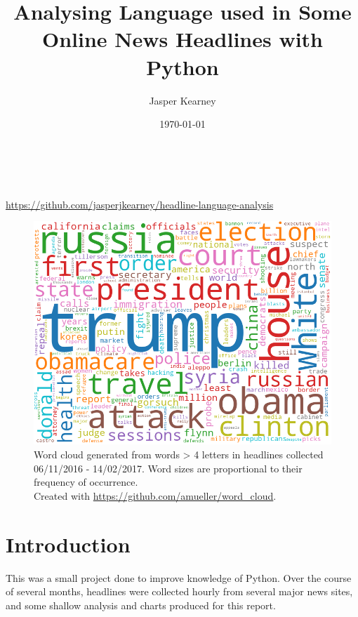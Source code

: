 \documentclass[a4paper,12pt]{article}
\title{Analysing Language used in Some Online News Headlines with Python}
\author{Jasper Kearney}
\date{\today}
\begin{document}
\makeatletter
\begin{titlepage}
    \begin{center}
        \vfill
        \huge \textbf{\@title} \\
        \vspace{1cm}
        \large \@author \\
        \vspace{1cm}
        \small \url{https://github.com/jasperjkearney/headline-language-analysis} \\
        
        \begin{figure}[h]
            \centering
            \includegraphics[width=\linewidth]{word_cloud.png}
            \caption{Word cloud generated from words > 4 letters in headlines collected 06/11/2016 - 14/02/2017. Word sizes are proportional to their frequency of occurrence.\\ Created with \url{https://github.com/amueller/word_cloud}.}
        \end{figure}
    \end{center}
\end{titlepage}
\makeatother

\section{Introduction}
This was a small project done to improve knowledge of Python. Over the course of several months, headlines were collected hourly from several major news sites, and some shallow analysis and charts produced for this report.
\end{document}
